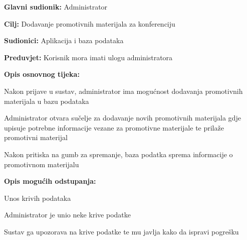 				\noindent {}
				\begin{packed_item}
					
					\item \textbf{Glavni sudionik: } Administrator
					\item  \textbf{Cilj:} Dodavanje promotivnih materijala za konferenciju
					\item  \textbf{Sudionici:} Aplikacija i baza podataka
					\item  \textbf{Preduvjet:} Korisnik mora imati ulogu administratora
					\item  \textbf{Opis osnovnog tijeka:}
					
					\item[] \begin{packed_enum}
						
						\item Nakon prijave u sustav, administrator ima mogućnost dodavanja promotivnih materijala u bazu podataka
						\item Administrator otvara sučelje za dodavanje novih promotivnih materijala gdje upisuje potrebne informacije vezane za promotivne materijale te prilaže promotivni materijal
						\item Nakon pritiska na gumb za spremanje, baza podatka sprema informacije o promotivnom materijalu
					\end{packed_enum}
					
					\item  \textbf{Opis mogućih odstupanja:}
					
					\item[] \begin{packed_item}
						
						\item[2.a] Unos krivih podataka
						\item[] \begin{packed_enum}
							
							\item Administrator je unio neke krive podatke
							\item Sustav ga upozorava na krive podatke te mu javlja kako da ispravi pogrešku
							
						\end{packed_enum}
						
						
					\end{packed_item}
				\end{packed_item}
				
